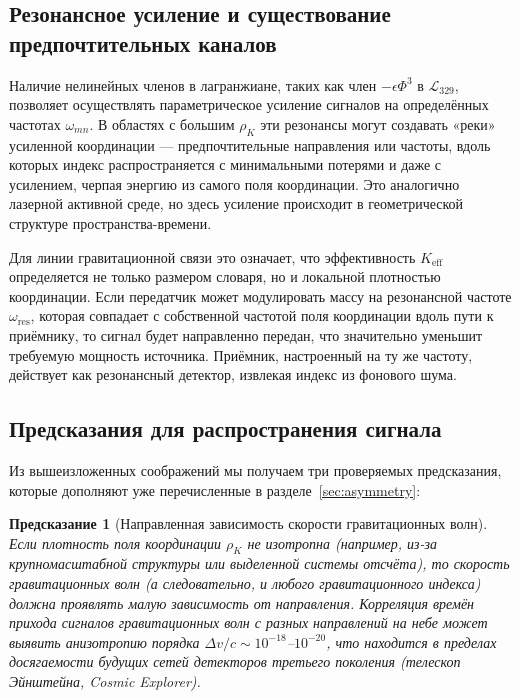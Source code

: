 \documentclass[12pt,a4paper]{article}
\newcommand{\Keff}{K_{\mathrm{eff}}}
\newtheorem{prediction}{Предсказание}
\begin{document}
	\subsection{Резонансное усиление и существование предпочтительных каналов}
	
	Наличие нелинейных членов в лагранжиане, таких как член \(-\epsilon \Phi^3\) в \(\mathcal{L}_{329}\), позволяет осуществлять параметрическое усиление сигналов на определённых частотах \(\omega_{mn}\). В областях с большим \(\rho_K\) эти резонансы могут создавать «реки» усиленной координации — предпочтительные направления или частоты, вдоль которых индекс распространяется с минимальными потерями и даже с усилением, черпая энергию из самого поля координации. Это аналогично лазерной активной среде, но здесь усиление происходит в геометрической структуре пространства-времени.
	
	Для линии гравитационной связи это означает, что эффективность \(\Keff\) определяется не только размером словаря, но и локальной плотностью координации. Если передатчик может модулировать массу на резонансной частоте \(\omega_{\mathrm{res}}\), которая совпадает с собственной частотой поля координации вдоль пути к приёмнику, то сигнал будет направленно передан, что значительно уменьшит требуемую мощность источника. Приёмник, настроенный на ту же частоту, действует как резонансный детектор, извлекая индекс из фонового шума.
	
	\subsection{Предсказания для распространения сигнала}
	
	Из вышеизложенных соображений мы получаем три проверяемых предсказания, которые дополняют уже перечисленные в разделе~\ref{sec:asymmetry}:
	
	\begin{prediction}[Направленная зависимость скорости гравитационных волн]
		Если плотность поля координации \(\rho_K\) не изотропна (например, из-за крупномасштабной структуры или выделенной системы отсчёта), то скорость гравитационных волн (а следовательно, и любого гравитационного индекса) должна проявлять малую зависимость от направления. Корреляция времён прихода сигналов гравитационных волн с разных направлений на небе может выявить анизотропию порядка \(\Delta v/c \sim 10^{-18}\)–\(10^{-20}\), что находится в пределах досягаемости будущих сетей детекторов третьего поколения (телескоп Эйнштейна, Cosmic Explorer).
	\end{prediction}
	
\end{document}

